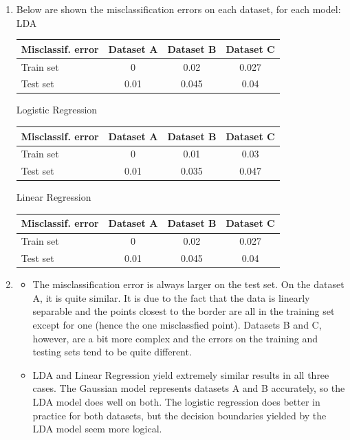 \documentclass[a4paper, 11pt]{report}
\begin{document}
\begin{enumerate}[label=\alph*]
    \item Below are shown the misclassification errors on each dataset, for each model: \\
    
    LDA \hfill
    \begin{tabular}{ | l | *{3}{| c} | }
         \hline
            Misclassif. error & Dataset A & Dataset B & Dataset C \\
         \hline
            Train set & 0    & 0.02  & 0.027 \\
            Test set  & 0.01 & 0.045 & 0.04  \\
         \hline
     \end{tabular}
    
    Logistic Regression \hfill
    \begin{tabular}{ | l | *{3}{| c} | }
         \hline
            Misclassif. error & Dataset A & Dataset B & Dataset C \\
         \hline
           Train set & 0    & 0.01  & 0.03  \\
           Test set  & 0.01 & 0.035 & 0.047 \\
         \hline
     \end{tabular}
    
    Linear Regression \hfill
    \begin{tabular}{ | l | *{3}{| c} | }
         \hline
            Misclassif. error & Dataset A & Dataset B & Dataset C \\
         \hline
           Train set & 0    & 0.02  & 0.027 \\
           Test set  & 0.01 & 0.045 & 0.04  \\
         \hline
    \end{tabular}
    
    \item \begin{itemize}
        \item The misclassification error is always larger on the test set. On the dataset A, it is quite similar. It is due to the fact that the data is linearly separable and the points closest to the border are all in the training set except for one (hence the one misclassfied point). Datasets B and C, however, are a bit more complex and the errors on the training and testing sets tend to be quite different.
        
        \item LDA and Linear Regression yield extremely similar results in all three cases. The Gaussian model represents datasets A and B accurately, so the LDA model does well on both. The logistic regression does better in practice for both datasets, but the decision boundaries yielded by the LDA model seem more logical.
        
    \end{itemize}
\end{enumerate}
\end{document}
